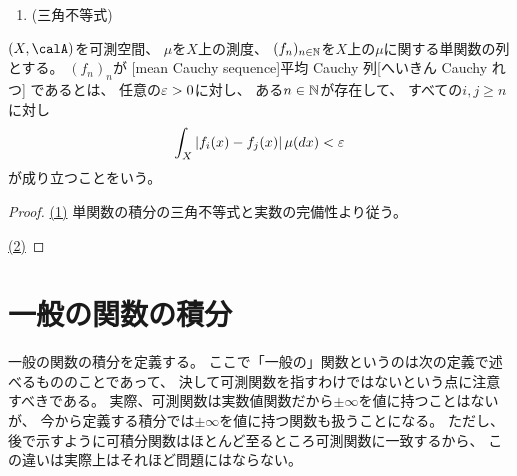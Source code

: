 \documentclass[report]{jlreq}
\begin{document}
\begin{proposition}[単関数の積分の基本性質]
    \begin{enumerate}
        \item (三角不等式)
    \end{enumerate}
    \TODO{}
\end{proposition}

\begin{definition}
    $(X, \calA)$を可測空間、
    $\mu$を$X$上の測度、
    $(f_n)_{n \in \mathbb{N}}$を$X$上の$\mu$に関する単関数の列とする。
    $(f_n)_n$が
    [mean Cauchy sequence]{平均 Cauchy 列}[へいきん Cauchy れつ]
    であるとは、
    任意の$\varepsilon > 0$に対し、
    ある$n \in \mathbb{N}$が存在して、
    すべての$i, j \ge n$に対し
    \begin{equation}
        \int_X |f_i(x) - f_j(x)| \, \mu(dx) < \varepsilon
    \end{equation}
    が成り立つことをいう。
\end{definition}


\begin{proof}
    \uline{(1)} \quad
    単関数の積分の三角不等式と実数の完備性より従う。

    \uline{(2)} \quad
    \TODO{}
\end{proof}

%
\section{一般の関数の積分}

一般の関数の積分を定義する。
ここで「一般の」関数というのは次の定義で述べるもののことであって、
決して可測関数を指すわけではないという点に注意すべきである。
実際、可測関数は実数値関数だから$\pm\infty$を値に持つことはないが、
今から定義する積分では$\pm\infty$を値に持つ関数も扱うことになる。
ただし、後で示すように可積分関数はほとんど至るところ可測関数に一致するから、
この違いは実際上はそれほど問題にはならない。
\end{document}
